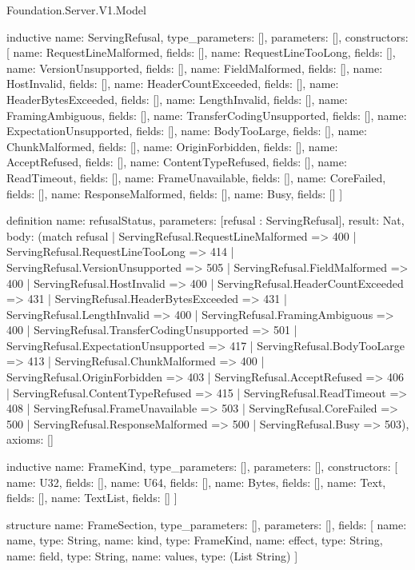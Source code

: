\begin{lexlean}{Foundation.Server.V1.Model}
\begin{semanticmodule}
inductive{
  name: ServingRefusal,
  type_parameters: [],
  parameters: [],
  constructors: [
    {name: RequestLineMalformed, fields: []},
    {name: RequestLineTooLong, fields: []},
    {name: VersionUnsupported, fields: []},
    {name: FieldMalformed, fields: []},
    {name: HostInvalid, fields: []},
    {name: HeaderCountExceeded, fields: []},
    {name: HeaderBytesExceeded, fields: []},
    {name: LengthInvalid, fields: []},
    {name: FramingAmbiguous, fields: []},
    {name: TransferCodingUnsupported, fields: []},
    {name: ExpectationUnsupported, fields: []},
    {name: BodyTooLarge, fields: []},
    {name: ChunkMalformed, fields: []},
    {name: OriginForbidden, fields: []},
    {name: AcceptRefused, fields: []},
    {name: ContentTypeRefused, fields: []},
    {name: ReadTimeout, fields: []},
    {name: FrameUnavailable, fields: []},
    {name: CoreFailed, fields: []},
    {name: ResponseMalformed, fields: []},
    {name: Busy, fields: []}
  ]
}

definition{
  name: refusalStatus,
  parameters: [refusal : ServingRefusal],
  result: Nat,
  body: (match refusal
    | ServingRefusal.RequestLineMalformed => 400
    | ServingRefusal.RequestLineTooLong => 414
    | ServingRefusal.VersionUnsupported => 505
    | ServingRefusal.FieldMalformed => 400
    | ServingRefusal.HostInvalid => 400
    | ServingRefusal.HeaderCountExceeded => 431
    | ServingRefusal.HeaderBytesExceeded => 431
    | ServingRefusal.LengthInvalid => 400
    | ServingRefusal.FramingAmbiguous => 400
    | ServingRefusal.TransferCodingUnsupported => 501
    | ServingRefusal.ExpectationUnsupported => 417
    | ServingRefusal.BodyTooLarge => 413
    | ServingRefusal.ChunkMalformed => 400
    | ServingRefusal.OriginForbidden => 403
    | ServingRefusal.AcceptRefused => 406
    | ServingRefusal.ContentTypeRefused => 415
    | ServingRefusal.ReadTimeout => 408
    | ServingRefusal.FrameUnavailable => 503
    | ServingRefusal.CoreFailed => 500
    | ServingRefusal.ResponseMalformed => 500
    | ServingRefusal.Busy => 503),
  axioms: []
}

inductive{
  name: FrameKind,
  type_parameters: [],
  parameters: [],
  constructors: [
    {name: U32, fields: []},
    {name: U64, fields: []},
    {name: Bytes, fields: []},
    {name: Text, fields: []},
    {name: TextList, fields: []}
  ]
}

structure{
  name: FrameSection,
  type_parameters: [],
  parameters: [],
  fields: [
    {name: name, type: String},
    {name: kind, type: FrameKind},
    {name: effect, type: String},
    {name: field, type: String},
    {name: values, type: (List String)}
  ]
}


\end{semanticmodule}
\end{lexlean}
